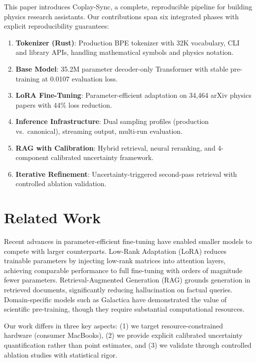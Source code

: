 \documentclass[11pt,a4paper]{article}
\begin{document}
This paper introduces Coplay-Sync, a complete, reproducible pipeline for building physics research assistants. Our contributions span six integrated phases with explicit reproducibility guarantees:

\begin{enumerate}[leftmargin=*]
    \item \textbf{Tokenizer (Rust)}: Production BPE tokenizer with 32K vocabulary, CLI and library APIs, handling mathematical symbols and physics notation.
    \item \textbf{Base Model}: 35.2M parameter decoder-only Transformer with stable pre-training at 0.0107 evaluation loss.
    \item \textbf{LoRA Fine-Tuning}: Parameter-efficient adaptation on 34,464 arXiv physics papers with 44\% loss reduction.
    \item \textbf{Inference Infrastructure}: Dual sampling profiles (production vs.~canonical), streaming output, multi-run evaluation.
    \item \textbf{RAG with Calibration}: Hybrid retrieval, neural reranking, and 4-component calibrated uncertainty framework.
    \item \textbf{Iterative Refinement}: Uncertainty-triggered second-pass retrieval with controlled ablation validation.
\end{enumerate}

\section{Related Work}

Recent advances in parameter-efficient fine-tuning have enabled smaller models to compete with larger counterparts. Low-Rank Adaptation (LoRA) \cite{hu2021lora} reduces trainable parameters by injecting low-rank matrices into attention layers, achieving comparable performance to full fine-tuning with orders of magnitude fewer parameters. Retrieval-Augmented Generation (RAG) \cite{lewis2020rag} grounds generation in retrieved documents, significantly reducing hallucination on factual queries. Domain-specific models such as Galactica \cite{taylor2022galactica} have demonstrated the value of scientific pre-training, though they require substantial computational resources.

Our work differs in three key aspects: (1) we target resource-constrained hardware (consumer MacBooks), (2) we provide explicit calibrated uncertainty quantification rather than point estimates, and (3) we validate through controlled ablation studies with statistical rigor.
\end{document}
